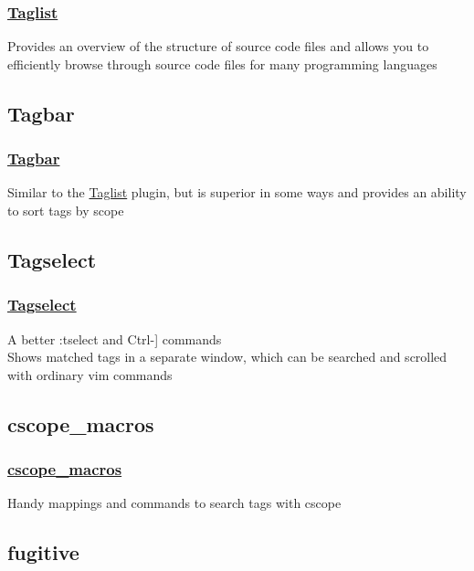 \documentclass[14pt,svgnames,compress]{beamer}
\newcommand\hl[1]{\textcolor{HlColor}{#1}}
\begin{document}
\begin{frame}
    \frametitle{
        \href{https://github.com/vim-scripts/taglist.vim}
             {Taglist}
    }
    \large
    Provides an overview of the structure of source code files and allows you to
    efficiently browse through source code files for many programming languages
    \par
\end{frame}


\subsection{Tagbar}

\begin{frame}
    \frametitle{
        \href{https://github.com/vim-scripts/Tagbar}
             {Tagbar}
    }
    \large
    Similar to the \href{https://github.com/vim-scripts/taglist.vim}{Taglist}
    plugin, but is superior in some ways and provides an ability to sort
    tags by scope \\
\end{frame}


\subsection{Tagselect}

\begin{frame}
    \frametitle{
        \href{https://github.com/vim-scripts/tagselect}
             {Tagselect}
    }
    \large
    A better \hl{:tselect} and \hl{Ctrl-]} commands \\ \bigskip
    Shows matched tags in a separate window, which can be searched and scrolled
    with ordinary vim commands \\
\end{frame}


\subsection{cscope\_macros}

\begin{frame}
    \frametitle{
        \href{https://github.com/vim-scripts/cscope\_macros.vim}
             {cscope\_macros}
    }
    \large
    Handy mappings and commands to search tags with \hl{cscope} \\
\end{frame}


\subsection{fugitive}
\end{document}

